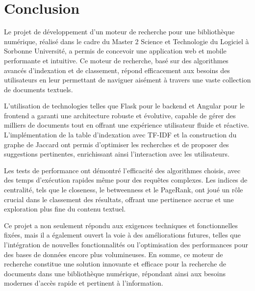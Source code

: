 \documentclass{article}
\begin{document}
\section{Conclusion}
Le projet de développement d'un moteur de recherche pour une bibliothèque numérique, réalisé dans le cadre du Master 2 Science et Technologie du Logiciel à Sorbonne Université, a permis de concevoir une application web et mobile performante et intuitive. Ce moteur de recherche, basé sur des algorithmes avancés d'indexation et de classement, répond efficacement aux besoins des utilisateurs en leur permettant de naviguer aisément à travers une vaste collection de documents textuels.

L'utilisation de technologies telles que Flask pour le backend et Angular pour le frontend a garanti une architecture robuste et évolutive, capable de gérer des milliers de documents tout en offrant une expérience utilisateur fluide et réactive. L'implémentation de la table d'indexation avec TF-IDF et la construction du graphe de Jaccard ont permis d'optimiser les recherches et de proposer des suggestions pertinentes, enrichissant ainsi l'interaction avec les utilisateurs.

Les tests de performance ont démontré l'efficacité des algorithmes choisis, avec des temps d'exécution rapides même pour des requêtes complexes. Les indices de centralité, tels que le closeness, le betweenness et le PageRank, ont joué un rôle crucial dans le classement des résultats, offrant une pertinence accrue et une exploration plus fine du contenu textuel.

Ce projet a non seulement répondu aux exigences techniques et fonctionnelles fixées, mais il a également ouvert la voie à des améliorations futures, telles que l'intégration de nouvelles fonctionnalités ou l'optimisation des performances pour des bases de données encore plus volumineuses. En somme, ce moteur de recherche constitue une solution innovante et efficace pour la recherche de documents dans une bibliothèque numérique, répondant ainsi aux besoins modernes d'accès rapide et pertinent à l'information.
\newpage


\end{document}
